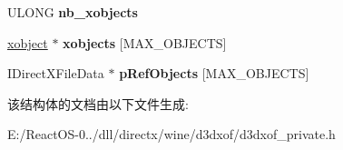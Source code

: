 \begin{DoxyCompactItemize}
U\+L\+O\+NG {\bfseries nb\+\_\+xobjects}
\item 
\mbox{\label{struct_i_direct_x_file_enum_object_impl_a5f9239887e8f49a19062ac8c6f4dd937}} 
\hyperlink{struct__xobject}{xobject} $\ast$ {\bfseries xobjects} \mbox{[}M\+A\+X\+\_\+\+O\+B\+J\+E\+C\+TS\mbox{]}
\item 
\mbox{\label{struct_i_direct_x_file_enum_object_impl_a62fe942ed526a61bb361d70437de61f5}} 
I\+Direct\+X\+File\+Data $\ast$ {\bfseries p\+Ref\+Objects} \mbox{[}M\+A\+X\+\_\+\+O\+B\+J\+E\+C\+TS\mbox{]}
\end{DoxyCompactItemize}


该结构体的文档由以下文件生成\+:\begin{DoxyCompactItemize}
\item 
E\+:/\+React\+O\+S-\/0../dll/directx/wine/d3dxof/d3dxof\+\_\+private.\+h\end{DoxyCompactItemize}
